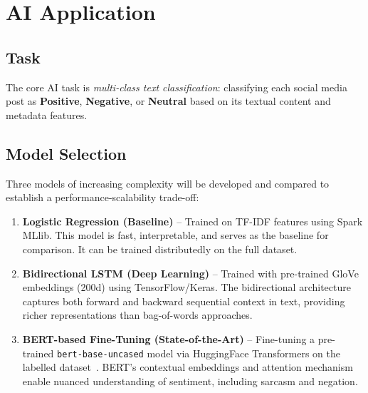 \documentclass[conference]{IEEEtran}
\begin{document}
\section{AI Application}

\subsection{Task}
The core AI task is \textit{multi-class text classification}: classifying each social media post as \textbf{Positive}, \textbf{Negative}, or \textbf{Neutral} based on its textual content and metadata features.

\subsection{Model Selection}
Three models of increasing complexity will be developed and compared to establish a performance-scalability trade-off:

\begin{enumerate}[leftmargin=*]
    \item \textbf{Logistic Regression (Baseline)} -- Trained on TF-IDF features using Spark MLlib. This model is fast, interpretable, and serves as the baseline for comparison. It can be trained distributedly on the full dataset.
    
    \item \textbf{Bidirectional LSTM (Deep Learning)} -- Trained with pre-trained GloVe embeddings (200d) using TensorFlow/Keras. The bidirectional architecture captures both forward and backward sequential context in text, providing richer representations than bag-of-words approaches.
    
    \item \textbf{BERT-based Fine-Tuning (State-of-the-Art)} -- Fine-tuning a pre-trained \texttt{bert-base-uncased} model via HuggingFace Transformers on the labelled dataset~\cite{devlin2019bert}. BERT's contextual embeddings and attention mechanism enable nuanced understanding of sentiment, including sarcasm and negation.
\end{enumerate}
\end{document}
